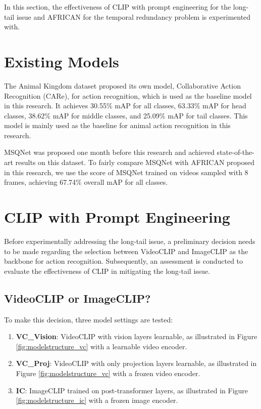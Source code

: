In this section, the effectiveness of CLIP with prompt engineering for the long-tail issue and AFRICAN for the temporal redundancy problem is experimented with.

\section {Existing Models}
The Animal Kingdom dataset proposed its own model, Collaborative Action Recognition (CARe), for action recognition, which is used as the baseline model in this research. It achieves 30.55\% mAP for all classes, 63.33\% mAP for head classes, 38.62\% mAP for middle classes, and 25.09\% mAP for tail classes. This model is mainly used as the baseline for animal action recognition in this research.

MSQNet \parencite{mondal2023msqnet} was proposed one month before this research and achieved state-of-the-art results on this dataset. To fairly compare MSQNet with AFRICAN proposed in this research, we use the score of MSQNet trained on videos sampled with 8 frames, achieving 67.74\% overall mAP for all classes. 

\section{CLIP with Prompt Engineering}
Before experimentally addressing the long-tail issue, a preliminary decision needs to be made regarding the selection between VideoCLIP and ImageCLIP as the backbone for action recognition. Subsequently, an assessment is conducted to evaluate the effectiveness of CLIP in mitigating the long-tail issue.

\subsection{VideoCLIP or ImageCLIP?}
\label{sec:imageclipbetter}
To make this decision, three model settings are tested: 

\begin{enumerate}
    \item \textbf{VC\_Vision}: VideoCLIP with vision layers learnable, as illustrated in Figure \ref{fig:modelstructure_vc} with a learnable video encoder.
    \item \textbf{VC\_Proj}: VideoCLIP with only projection layers learnable, as illustrated in Figure \ref{fig:modelstructure_vc} with a frozen video encoder.
    \item \textbf{IC}: ImageCLIP trained on post-transformer layers, as illustrated in Figure \ref{fig:modelstructure_ic} with a frozen image encoder.
\end{enumerate}

